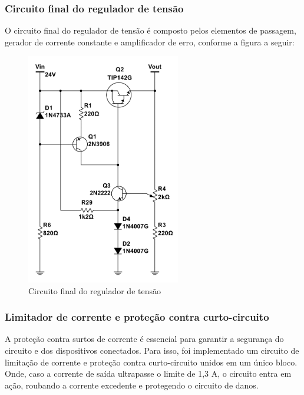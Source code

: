 \subsubsection*{Circuito final do regulador de tensão}

O circuito final do regulador de tensão é composto pelos elementos de passagem, gerador de corrente constante e amplificador de erro, conforme a figura a seguir:

\begin{figure}[H]
    \centering
    \includegraphics[width=0.6\textwidth]{../imagens/circuito_regulador.png}
    \caption{Circuito final do regulador de tensão}
    \label{fig:regulador_tensao}
\end{figure}

\subsubsection{Limitador de corrente e proteção contra curto-circuito}

A proteção contra surtos de corrente é essencial para garantir a segurança do circuito e dos dispositivos conectados. Para isso, foi implementado um circuito de limitação de corrente e proteção contra curto-circuito unidos em um único bloco. Onde, caso a corrente de saída ultrapasse o limite de 1,3 A, o circuito entra em ação, roubando a corrente excedente e protegendo o circuito de danos.

